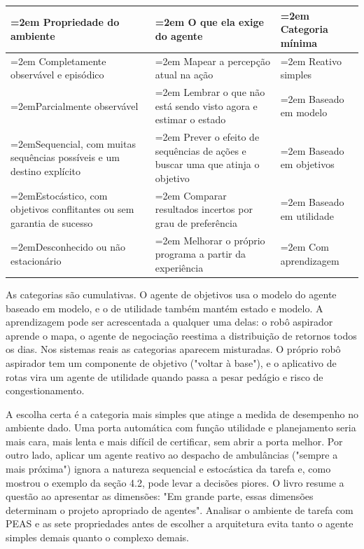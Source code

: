 \documentclass[12pt, a4paper]{article}
\begin{document}
\begingroup
\setlength{\tabcolsep}{4.0pt}
\begin{longtable}{@{}>{\raggedright\hyphenpenalty=30\tolerance=999\emergencystretch=2em\arraybackslash}p{6.05cm}>{\raggedright\hyphenpenalty=30\tolerance=999\emergencystretch=2em\arraybackslash}p{6.13cm}>{\raggedright\hyphenpenalty=30\tolerance=999\emergencystretch=2em\arraybackslash}p{2.54cm}@{}}
\toprule\noalign{}
Propriedade do ambiente & O que ela exige do agente & Categoria mínima \\
\midrule\noalign{}
\endhead
\bottomrule\noalign{}
\endlastfoot
Completamente ob\-ser\-vá\-vel e episódico & Mapear a percepção atual na ação & Reativo simples \\
Parcialmente ob\-ser\-vá\-vel & Lembrar o que não está sendo visto agora e estimar o estado & Baseado em modelo \\
Sequencial, com muitas sequên\-cias possíveis e um destino explícito & Prever o efeito de sequên\-cias de ações e buscar uma que atinja o objetivo & Baseado em objetivos \\
Es\-to\-cás\-tico, com objetivos conflitantes ou sem garantia de sucesso & Comparar resultados incertos por grau de pre\-fe\-rên\-cia & Baseado em utilidade \\
Desconhecido ou não es\-ta\-ci\-o\-ná\-rio & Melhorar o próprio programa a partir da ex\-pe\-ri\-ên\-cia & Com aprendizagem \\
\end{longtable}
\endgroup

As categorias são cumulativas. O agente de objetivos usa o modelo do agente baseado em modelo, e o de utilidade também mantém estado e modelo. A aprendizagem pode ser acrescentada a qualquer uma delas: o robô aspirador aprende o mapa, o agente de negociação reestima a distribuição de retornos todos os dias. Nos sistemas reais as categorias aparecem misturadas. O próprio robô aspirador tem um componente de objetivo ("voltar à base"), e o aplicativo de rotas vira um agente de utilidade quando passa a pesar pedágio e risco de congestionamento.

A escolha certa é a categoria mais simples que atinge a medida de desempenho no ambiente dado. Uma porta automática com função utilidade e planejamento seria mais cara, mais lenta e mais difícil de certificar, sem abrir a porta melhor. Por outro lado, aplicar um agente reativo ao despacho de ambulâncias ("sempre a mais próxima") ignora a natureza sequencial e estocástica da tarefa e, como mostrou o exemplo da seção 4.2, pode levar a decisões piores. O livro resume a questão ao apresentar as dimensões: "Em grande parte, essas dimensões determinam o projeto apropriado de agentes". Analisar o ambiente de tarefa com PEAS e as sete propriedades antes de escolher a arquitetura evita tanto o agente simples demais quanto o complexo demais.
\end{document}
